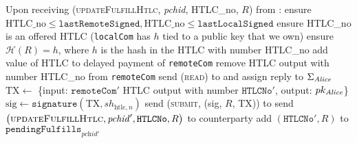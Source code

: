 \begin{algorithmic}[1]
    \State Upon receiving (\textsc{updateFulfillHtlc}, \textit{pchid}, HTLC\_no,
    $R$) from \bob:
    \Indent
      \State ensure $\mathrm{HTLC\_no} \leq \mathtt{lastRemoteSigned},
      \mathrm{HTLC\_no} \leq \mathtt{lastLocalSigned}$
      \State ensure HTLC\_no is an offered HTLC (\texttt{localCom} has $h$ tied
      to a public key that we own)
      \State ensure $\mathcal{H}\left(R\right) = h$, where $h$ is the hash in
      the HTLC with number HTLC\_no
      \State add value of HTLC to delayed payment of \texttt{remoteCom}
      \State remove HTLC output with number HTLC\_no from \texttt{remoteCom}
       
         
          \State send (\textsc{read}) to \ledger{} and assign reply to
          $\Sigma_{\mathit{Alice}}$
            \State $\mathrm{TX} \gets$ \{input: $\mathtt{remoteCom}'$ HTLC
            output with number $\mathtt{HTLCNo}'$, output: $pk_{\mathit{Alice}}$\}
            \State $\mathrm{sig} \gets \mathtt{signature}\left(\mathrm{TX},
            sh_{\mathrm{htlc}, n}\right)$
            \State send (\textsc{submit}, (sig, $R$, TX)) to \ledger{}
          \Else {}
            \State send $\left(\textsc{updateFulfillHtlc}, \mathit{pchid}',
            \mathtt{HTLCNo}, R\right)$ to counterparty
          \EndIf
        \Else {}
          \State add $\left(\mathtt{HTLCNo}', R\right)$ to
          $\mathtt{pendingFulfills}_{\textit{pchid}'}$
        \EndIf
      \EndIf
    \EndIndent
    \State


\end{algorithmic}
